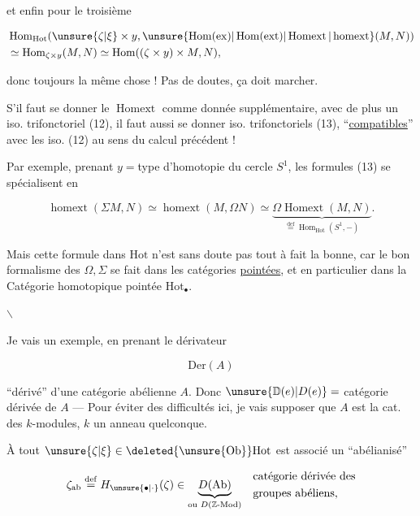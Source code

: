 et enfin pour le troisième

\[
\begin{aligned}
&\operatorname{Hom}_{\mathrm{Hot}}(\unsure{\zeta|\xi}\times y,\unsure{\operatorname{Hom}(\mathrm{ex})|\operatorname{Hom}(\mathrm{ext})|\operatorname{Homext}|\operatorname{homext}}(M,N))\\
&\simeq\operatorname{Hom}_{\zeta\times y}(M,N)\simeq\operatorname{Hom}((\zeta\times y)\times M,N),
\end{aligned}
\]

donc toujours la même chose !  Pas de doutes, ça doit marcher.

S'il faut se donner le $\operatorname{Homext}$  comme donnée supplémentaire, avec de plus un iso. trifonctoriel (12), il faut aussi se donner  iso. trifonctoriels (13), ``\uline{compatibles}'' avec les iso. (12) au sens du calcul précédent ! 

Par exemple, prenant $y={}$type d'homotopie du cercle $S^1$, les formules (13) se spécialisent en

\[
\operatorname{homext}(\Sigma M,N)\simeq
\operatorname{homext}(M,\Omega N)\simeq
\underbrace{\Omega\operatorname{Homext}(M,N)}_{\overset{\mathrm{def}}{=}\operatorname{Hom}_{\mathrm{Hot}}(S^1,-)}.
\tag*{(14)}
\]

Mais cette formule dans $\mathrm{Hot}$ n'est sans doute pas tout à fait la bonne, car le bon formalisme des $\Omega,\Sigma$ se fait dans les catégories \uline{pointées}, et en particulier dans la Catégorie homotopique pointée $\mathrm{Hot}_{\bullet}$.

\hfil$\backslash$\hfil

Je vais  un exemple, en prenant le dérivateur

\[
\mathrm{Der}(A)
\]

 ``dérivé'' d'une catégorie abélienne $A$. Donc $\unsure{\mathbb D(e)|D(e)}={}$catégorie dérivée de $A$ --- Pour éviter des
difficultés  ici, je vais supposer que $A$ est la cat. des $k$-modules, $k$ un anneau quelconque.

À tout $\unsure{\zeta|\xi}\in\deleted{\unsure{\mathrm{Ob}}}\mathrm{Hot}$ est associé un ``abélianisé''

\[
\zeta_{\mathrm{ab}}\overset{\mathrm{def}}{=}H_{\unsure{\bullet|\cdot}}(\zeta)\in
\underset{\text{ou }D(\mathbb Z\text{-}\mathrm{Mod})}{\underbrace{D(\mathrm{Ab})}}
\quad\begin{aligned}&\text{catégorie dérivée des}\\&\text{groupes abéliens,}\end{aligned}
\]

